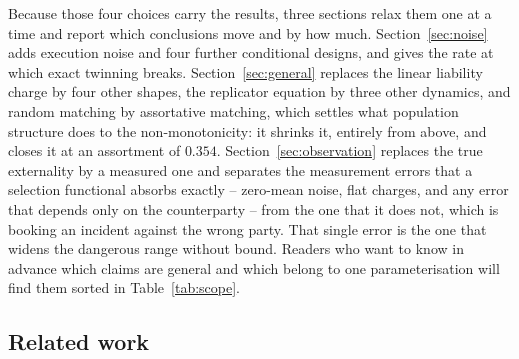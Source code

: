 \documentclass[pdflatex]{sn-jnl}
\theoremstyle{thmstyleone}
\theoremstyle{thmstylethree}
\theoremstyle{thmstyletwo}
\begin{document}
Because those four choices carry the results, three sections relax them one at
a time and report which conclusions move and by how much.
Section~\ref{sec:noise} adds execution noise and four further conditional
designs, and gives the rate at which exact twinning breaks.
Section~\ref{sec:general} replaces the linear liability charge by four other
shapes, the replicator equation by three other dynamics, and random matching
by assortative matching, which settles what population structure does to the
non-monotonicity: it shrinks it, entirely from above, and closes it at an
assortment of $0.354$. Section~\ref{sec:observation} replaces the true
externality by a measured one and separates the measurement errors that a
selection functional absorbs exactly -- zero-mean noise, flat charges, and any
error that depends only on the counterparty -- from the one that it does not,
which is booking an incident against the wrong party. That single error is the
one that widens the dangerous range without bound. Readers who want to know in
advance which claims are general and which belong to one parameterisation will
find them sorted in Table~\ref{tab:scope}.

\subsection{Related work}
\end{document}
